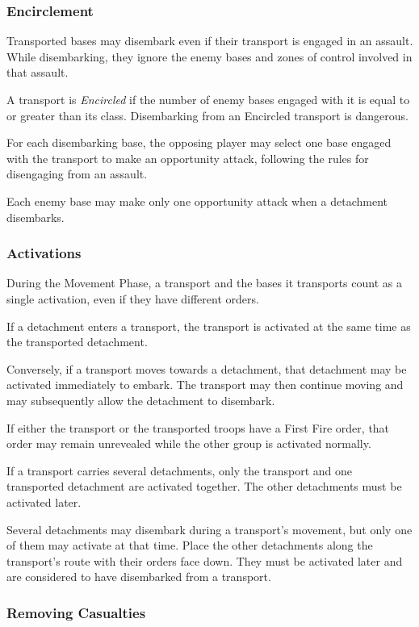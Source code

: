 \subsubsection{Encirclement}

Transported bases may disembark even if their transport is engaged in an assault. While disembarking, they ignore the enemy bases and zones of control involved in that assault.

A transport is \textit{Encircled} if the number of enemy bases engaged with it is equal to or greater than its class. Disembarking from an Encircled transport is dangerous.

For each disembarking base, the opposing player may select one base engaged with the transport to make an opportunity attack, following the rules for disengaging from an assault.

Each enemy base may make only one opportunity attack when a detachment disembarks.

\subsubsection{Activations}

During the Movement Phase, a transport and the bases it transports count as a single activation, even if they have different orders.

If a detachment enters a transport, the transport is activated at the same time as the transported detachment.

Conversely, if a transport moves towards a detachment, that detachment may be activated immediately to embark. The transport may then continue moving and may subsequently allow the detachment to disembark.

If either the transport or the transported troops have a First Fire order, that order may remain unrevealed while the other group is activated normally.

If a transport carries several detachments, only the transport and one transported detachment are activated together. The other detachments must be activated later.

Several detachments may disembark during a transport's movement, but only one of them may activate at that time. Place the other detachments along the transport's route with their orders face down. They must be activated later and are considered to have disembarked from a transport.

\subsubsection{Removing Casualties}

